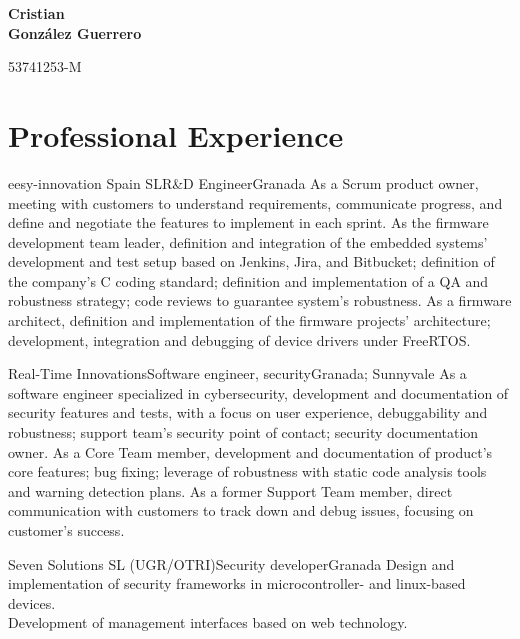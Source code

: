 \documentclass[11pt,a4paper,sans,spanish]{moderncv}
\begin{document}
\begin{minipage}[c]{\textwidth-100pt-0.5em}
    \begin{flushright}
        \textbf{\Huge{Cristian\\\vspace{4pt}González Guerrero}}

        \vspace{4pt}
        \small{53741253-M}
    \end{flushright}
\end{minipage}
\vspace{-5em}

\makecvtitle

\section{Professional Experience}

{eesy-innovation Spain SL}{R\&D Engineer}{Granada}{}
{As a Scrum product owner, meeting with customers to understand requirements,
communicate progress, and define and negotiate the features to implement in each
sprint.
As the firmware development team leader, definition and integration of the
embedded systems' development and test setup based on Jenkins, Jira, and
Bitbucket; definition of the company's C coding standard; definition and
implementation of a QA and robustness strategy; code reviews to guarantee
system's robustness.
As a firmware architect, definition and implementation of the firmware projects'
architecture; development, integration and debugging of device drivers under
FreeRTOS.
}

{Real-Time Innovations}{Software engineer, security}{Granada; Sunnyvale}{}
{As a software engineer specialized in cybersecurity, development and
documentation of security features and tests, with a focus on user experience,
debuggability and robustness; support team's security point of contact;
security documentation owner.
As a Core Team member, development and documentation of product's core
features; bug fixing; leverage of robustness with static code analysis tools
and warning detection plans.
As a former Support Team member, direct communication with customers to track
down and debug issues, focusing on customer's success.
}

{Seven Solutions SL (UGR/OTRI)}{Security developer}{Granada}{}
{Design and implementation of security frameworks in microcontroller- and
linux-based devices.\\ Development of management interfaces based on web
technology.
}
\end{document}
